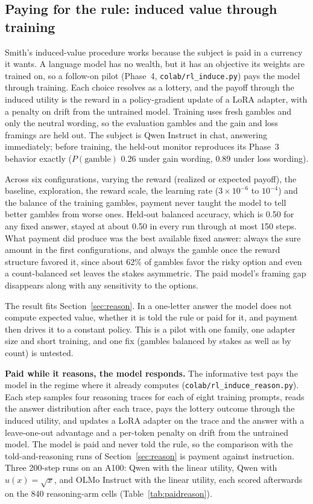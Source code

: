 \documentclass[11pt]{article}
\begin{document}
\subsection{Paying for the rule: induced value through training}\label{sec:paid}
Smith's induced-value procedure works because the subject is paid in a currency it wants. A language model
has no wealth, but it has an objective its weights are trained on, so a follow-on pilot (Phase~4,
\texttt{colab/rl\_induce.py}) pays the model through training. Each choice resolves as a lottery, and the
payoff through the induced utility is the reward in a policy-gradient update of a LoRA adapter, with a
penalty on drift from the untrained model. Training uses fresh gambles and only the neutral wording, so
the evaluation gambles and the gain and loss framings are held out. The subject is Qwen Instruct in chat,
answering immediately; before training, the held-out monitor reproduces its Phase~3 behavior exactly
($P(\text{gamble})$ 0.26 under gain wording, 0.89 under loss wording).

Across six configurations, varying the reward (realized or expected payoff), the baseline, exploration,
the reward scale, the learning rate ($3\times10^{-6}$ to $10^{-4}$) and the balance of the training
gambles, payment never taught the model to tell better gambles from worse ones. Held-out balanced accuracy,
which is 0.50 for any fixed answer, stayed at about 0.50 in every run through at most 150 steps. What
payment did produce was the best available fixed answer: always the sure amount in the first
configurations, and always the gamble once the reward structure favored it, since about 62\% of gambles
favor the risky option and even a count-balanced set leaves the stakes asymmetric. The paid model's
framing gap disappears along with any sensitivity to the options.

The result fits Section~\ref{sec:reason}. In a one-letter answer the model does not compute expected value,
whether it is told the rule or paid for it, and payment then drives it to a constant policy. This is a
pilot with one family, one adapter size and short training, and one fix (gambles balanced by stakes as
well as by count) is untested.

\textbf{Paid while it reasons, the model responds.} The informative test pays the model in the regime where
it already computes (\texttt{colab/rl\_induce\_reason.py}). Each step samples four reasoning traces for each
of eight training prompts, reads the answer distribution after each trace, pays the lottery outcome
through the induced utility, and updates a LoRA adapter on the trace and the answer with a
leave-one-out advantage and a per-token penalty on drift from the untrained model. The model is paid and
never told the rule, so the comparison with the told-and-reasoning runs of Section~\ref{sec:reason} is
payment against instruction. Three 200-step runs on an A100: Qwen with the linear utility, Qwen with
$u(x) = \sqrt{x}$, and OLMo Instruct with the linear utility, each scored afterwards on the 840
reasoning-arm cells (Table~\ref{tab:paidreason}).
\end{document}
